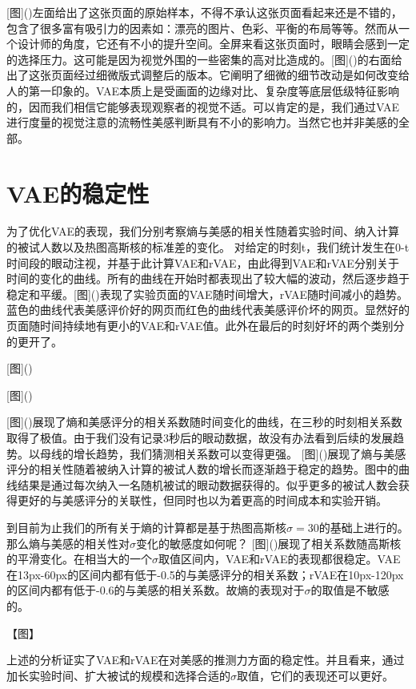 [图]()左面给出了这张页面的原始样本，不得不承认这张页面看起来还是不错的，包含了很多富有吸引力的因素如：漂亮的图片、色彩、平衡的布局等等。然而从一个设计师的角度，它还有不小的提升空间。全屏来看这张页面时，眼睛会感到一定的选择压力。这可能是因为视觉外围的一些密集的高对比造成的。[图]()的右面给出了这张页面经过细微版式调整后的版本。它阐明了细微的细节改动是如何改变给人的第一印象的。VAE本质上是受画面的边缘对比、复杂度等底层低级特征影响的，因而我们相信它能够表现观察者的视觉不适。可以肯定的是，我们通过VAE进行度量的视觉注意的流畅性美感判断具有不小的影响力。当然它也并非美感的全部。

\section{VAE的稳定性}
为了优化VAE的表现，我们分别考察熵与美感的相关性随着实验时间、纳入计算的被试人数以及热图高斯核的标准差的变化。
对给定的时刻t，我们统计发生在0-t时间段的眼动注视，并基于此计算VAE和rVAE，由此得到VAE和rVAE分别关于时间的变化的曲线。所有的曲线在开始时都表现出了较大幅的波动，然后逐步趋于稳定和平缓。[图]()表现了实验页面的VAE随时间增大，rVAE随时间减小的趋势。
蓝色的曲线代表美感评价好的网页而红色的曲线代表美感评价坏的网页。显然好的页面随时间持续地有更小的VAE和rVAE值。此外在最后的时刻好坏的两个类别分的更开了。

[图]()

[图]()

[图]()展现了熵和美感评分的相关系数随时间变化的曲线，在三秒的时刻相关系数取得了极值。由于我们没有记录3秒后的眼动数据，故没有办法看到后续的发展趋势。以母线的增长趋势，我们猜测相关系数可以变得更强。
[图]()展现了熵与美感评分的相关性随着被纳入计算的被试人数的增长而逐渐趋于稳定的趋势。图中的曲线结果是通过每次纳入一名随机被试的眼动数据获得的。似乎更多的被试人数会获得更好的与美感评分的关联性，但同时也以为着更高的时间成本和实验开销。

到目前为止我们的所有关于熵的计算都是基于热图高斯核$\sigma = 30$的基础上进行的。那么熵与美感的相关性对$\sigma$变化的敏感度如何呢？
[图]()展现了相关系数随高斯核的平滑变化。在相当大的一个$\sigma$取值区间内，VAE和rVAE的表现都很稳定。VAE在13px-60px的区间内都有低于-0.5的与美感评分的相关系数；rVAE在10px-120px的区间内都有低于-0.6的与美感的相关系数。故熵的表现对于$\sigma$的取值是不敏感的。

【图】

上述的分析证实了VAE和rVAE在对美感的推测力方面的稳定性。并且看来，通过加长实验时间、扩大被试的规模和选择合适的$\sigma$取值，它们的表现还可以更好。

